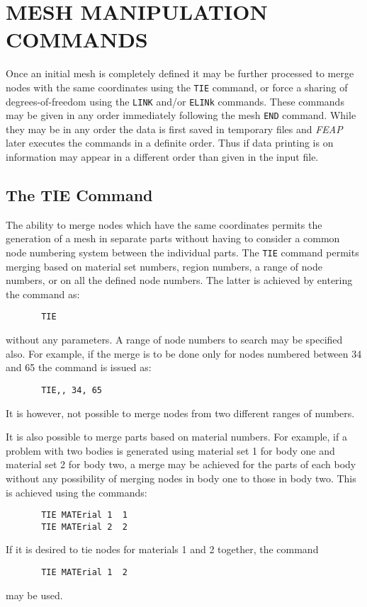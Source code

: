\chapter[Mesh Manipulation Commands]{MESH MANIPULATION COMMANDS}
\label{manip}

Once an initial mesh is completely defined it may be further processed
to merge nodes with the same coordinates using the {\tt TIE} command, or
force a sharing of degrees-of-freedom using the {\tt LINK} and/or {\tt ELINk}
commands.  These commands may be given in any order immediately following
the mesh {\tt END} command.  While they may be in any order the data is
first saved in temporary files and {\sl FEAP} later executes the commands in
a definite order.  Thus if data printing is on information may appear in
a different order than given in the input file.

\section{The TIE Command}
\label{tie}

The ability to merge nodes which have the same coordinates permits
the generation of a mesh in separate parts without having to consider
a common node numbering system between the individual parts.
The {\tt TIE} command permits merging
based on material set numbers, region numbers, a range of node numbers,
or on all the defined node numbers.
The latter is achieved by entering the command as:
\begin{verbatim}
       TIE
\end{verbatim}
without any parameters.  A range of node numbers to search may be
specified also.  For example, if the merge is to be done only for
nodes numbered between 34 and 65 the command is issued as:
\begin{verbatim}
       TIE,, 34, 65
\end{verbatim}
It is however, not possible to merge nodes from two different ranges of
numbers.

It is also possible to merge parts based on material numbers.  For example,
if a problem with two bodies is generated using material set 1
for body one and material set 2 for body two,
a merge may be achieved for the parts of each body
without any possibility of merging nodes in body one to those in
body two.  This is achieved using the commands:
\begin{verbatim}
       TIE MATErial 1  1
       TIE MATErial 2  2
\end{verbatim}
If it is desired to tie nodes for materials 1 and 2 together, the command
\begin{verbatim}
       TIE MATErial 1  2
\end{verbatim}
may be used.

